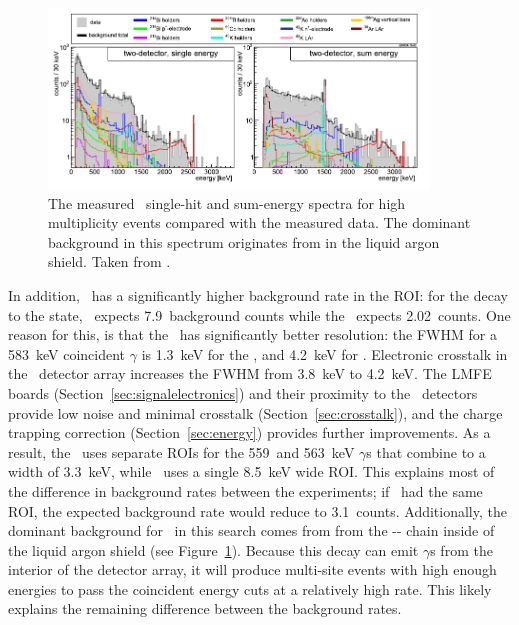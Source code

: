 \documentclass[/main.tex]{subfiles}
\begin{document}
\begin{figure}[h]
  \centering
  \includegraphics[width=0.9\textwidth]{gerdabackgrounds}
  \caption[\Gerda\ multi-site event backgrounds]{\label{gerdabgmodel}
    The measured \Gerda\ single-hit and sum-energy spectra for high multiplicity events compared with the measured data. The dominant background in this spectrum originates from  in the liquid argon shield. Taken from \cite{gerdaESresult}.
  }
\end{figure}
In addition, \Gerda\ has a significantly higher background rate in the ROI: for the decay to the  state, \Gerda\ expects 7.9~background counts while the \MJD\ expects 2.02~counts.
One reason for this, is that the \MJD\ has significantly better resolution: the FWHM for a  583~keV coincident $\gamma$ is 1.3~keV for the \MJD, and 4.2~keV for \Gerda.
Electronic crosstalk in the \Gerda\ detector array increases the FWHM from 3.8~keV to 4.2~keV.
The LMFE boards (Section~\ref{sec:signalelectronics}) and their proximity to the \MJ\ detectors provide low noise and minimal crosstalk (Section~\ref{sec:crosstalk}), and the charge trapping correction (Section~\ref{sec:energy}) provides further improvements.
As a result, the \MJD\ uses separate ROIs for the 559~and 563~keV $\gamma$s that combine to a width of 3.3~keV, while \Gerda\ uses a single 8.5~keV wide ROI.
This explains most of the difference in background rates between the experiments; if \Gerda\ had the same ROI, the expected background rate would reduce to 3.1~counts.
Additionally, the dominant background for \Gerda\ in this search comes from  from the -- chain inside of the liquid argon shield (see Figure~\ref{gerdabgmodel}).
Because this decay can emit $\gamma$s from the interior of the detector array, it will produce multi-site events with high enough energies to pass the coincident energy cuts at a relatively high rate.
This likely explains the remaining difference between the background rates.
\end{document}
